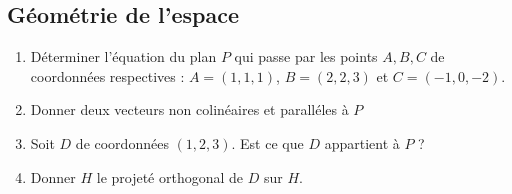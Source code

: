 \documentclass[a4paper, 11pt]{article}
\begin{document}
\vspace*{0.5cm}
\subsection{G\'eom\'etrie de l'espace}
\begin{exercice}
	\begin{enumerate}
		\item Déterminer l'équation du plan $P$ qui passe par les points $A ,B,C$ de coordonnées respectives :
		      $A = (1,1,1)$,  $B =(2,2,3)$ et $C =(-1,0,-2)$.
		\item Donner deux vecteurs non colinéaires et  paralléles à $P$
		\item Soit $D$ de coordonnées $(1,2,3)$.
		      Est ce que $D$ appartient à $P$ ?
		\item Donner $H$ le projeté orthogonal de $D$ sur $H$.
	\end{enumerate}
\end{exercice}
\end{document}
